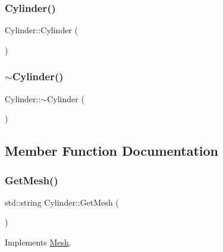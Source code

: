 \mbox{\label{class_cylinder_a01dc978cb576f834b9545e43d4dad2a2}} 
\subsubsection{\texorpdfstring{Cylinder()}{Cylinder()}\hspace{0.1cm}{\footnotesize\ttfamily [3/3]}}
{\footnotesize\ttfamily Cylinder\+::\+Cylinder (\begin{DoxyParamCaption}{ }\end{DoxyParamCaption})}

\mbox{\label{class_cylinder_a05ab556f0ae3cd6e99d9d1f3caca80b3}} 
\subsubsection{\texorpdfstring{$\sim$Cylinder()}{~Cylinder()}\hspace{0.1cm}{\footnotesize\ttfamily [3/3]}}
{\footnotesize\ttfamily Cylinder\+::$\sim$\+Cylinder (\begin{DoxyParamCaption}{ }\end{DoxyParamCaption})}



\subsection{Member Function Documentation}
\mbox{\label{class_cylinder_adada3adc010fbd6530969b3f7845c727}} 
\subsubsection{\texorpdfstring{GetMesh()}{GetMesh()}}
{\footnotesize\ttfamily std\+::string Cylinder\+::\+Get\+Mesh (\begin{DoxyParamCaption}{ }\end{DoxyParamCaption})\hspace{0.3cm}{\ttfamily [virtual]}}



Implements \mbox{\hyperlink{class_mesh_ac9a0bc76a4e34c3985cbc4c20692c7df}{Mesh}}.

